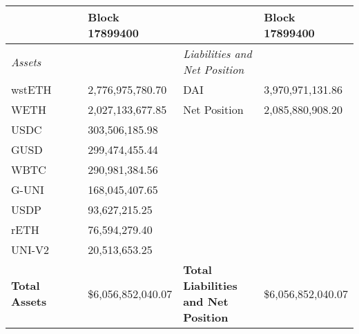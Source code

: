 
\begin{longtable}{@{}p{0.25\linewidth}p{0.25\linewidth}p{0.25\linewidth}p{0.25\linewidth}@{}}

\toprule


& Block 17899400 & & Block 17899400 \\

\midrule
\textit{Assets} & & \textit{Liabilities and Net Position} \\
wstETH & 2,776,975,780.70 & DAI &3,970,971,131.86 \\
WETH & 2,027,133,677.85 & Net Position &2,085,880,908.20 \\
USDC & 303,506,185.98 & & \\
GUSD & 299,474,455.44 & & \\
WBTC & 290,981,384.56 & & \\
G-UNI & 168,045,407.65 & & \\
USDP & 93,627,215.25 & & \\
rETH & 76,594,279.40 & & \\
UNI-V2 & 20,513,653.25 & & \\

\midrule

\textbf{Total Assets} & \$6,056,852,040.07 & \textbf{Total Liabilities and Net Position} & \$6,056,852,040.07 \\

\bottomrule

\end{longtable}
